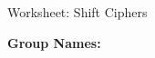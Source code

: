 \documentclass[12pt]{article}
\begin{document}
\begin{center}
{\Large  Worksheet:  Shift Ciphers	}
\end{center}



\noindent \textbf{Group Names:} \hrulefill \\
\end{document}
